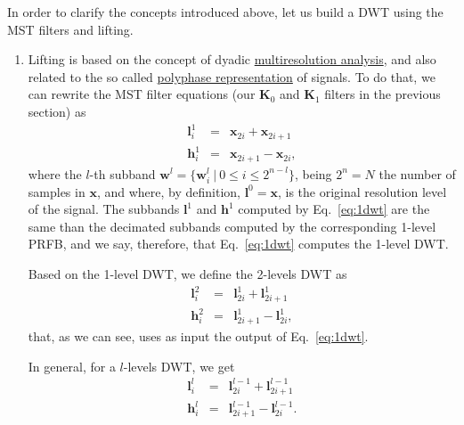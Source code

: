 In order to clarify the concepts introduced above, let us build a
DWT using the MST filters and lifting.

\begin{enumerate}

\item Lifting is based on the concept of dyadic
  \href{https://en.wikipedia.org/wiki/Multiresolution_analysis}{multiresolution
    analysis}, and also related to the so called
  \href{https://en.wikipedia.org/wiki/Polyphase_matrix}{polyphase
    representation} of signals. To do that, we can rewrite
  the MST filter equations (our ${\mathbf K}_0$ and ${\mathbf K}_1$
  filters in the previous section) as
  \begin{equation}
    \begin{array}{rcl}
      {\mathbf l}^1_i & = & {\mathbf x}_{2i} + {\mathbf x}_{2i+1} \\
      {\mathbf h}^1_i & = & {\mathbf x}_{2i+1} - {\mathbf x}_{2i},
    \end{array}
    \label{eq:1dwt}
  \end{equation}
  where the $l$-th subband
  ${\mathbf w}^l=\{{\mathbf w}_i^l~|~0\le i\le 2^{n-l}\}$, being
  $2^n=N$ the number of samples in ${\mathbf x}$, and where, by
  definition, ${\mathbf l}^0={\mathbf x}$, is the original resolution
  level of the signal. The subbands ${\mathbf l}^1$ and
  ${\mathbf h}^1$ computed by Eq.~\eqref{eq:1dwt} are the same than
  the decimated subbands computed by the corresponding 1-level PRFB,
  and we say, therefore, that Eq.~\eqref{eq:1dwt} computes the
  1-level DWT.

  Based on the 1-level DWT, we define the 2-levels DWT as
  \begin{equation}
    \begin{array}{rcl}
      {\mathbf l}^2_i & = & {\mathbf l}^1_{2i} + {\mathbf l}^1_{2i+1} \\
      {\mathbf h}^2_i & = & {\mathbf l}^1_{2i+1} - {\mathbf l}^1_{2i},
    \end{array}
    \label{eq:2dwt}
  \end{equation}
  that, as we can see, uses as input the output of Eq.~\eqref{eq:1dwt}.

  In general, for a $l$-levels DWT, we get
    \begin{equation}
    \begin{array}{rcl}
      {\mathbf l}^l_i & = & {\mathbf l}^{l-1}_{2i} + {\mathbf l}^{l-1}_{2i+1} \\
      {\mathbf h}^l_i & = & {\mathbf l}^{l-1}_{2i+1} - {\mathbf l}^{l-1}_{2i}.
    \end{array}
    \label{eq:ldwt}
  \end{equation}


\end{enumerate}
